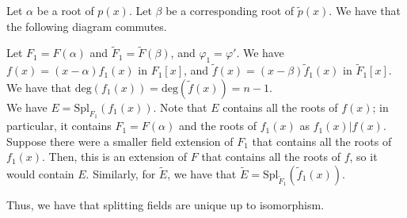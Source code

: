 \documentclass[10pt]{extarticle}
\begin{document}
  Let $\alpha$ be a root of $p(x)$. Let $\beta$ be a corresponding root of $\tilde{p}(x)$. We have that the following diagram commutes.
  \begin{center}
  \end{center}
  Let $F_1 = F(\alpha)$ and $\tilde{F}_1 = \tilde{F}(\beta)$, and $\varphi_1 = \varphi'$. We have $f(x) = (x-\alpha)f_1(x)$ in $F_1[x]$, and $\tilde{f}(x) = (x-\beta)\tilde{f}_1(x)$ in $\tilde{F}_1[x]$. We have that $\text{deg}(f_1(x)) = \text{deg}(\tilde{f}(x)) = n-1$.\\

  We have $E = \text{Spl}_{F_1}(f_1(x))$. Note that $E$ contains all the roots of $f(x)$; in particular, it contains $F_1 = F(\alpha)$ and the roots of $f_1(x)$ as $f_1(x) | f(x)$. Suppose there were a smaller field extension of $F_1$ that contains all the roots of $f_1(x)$. Then, this is an extension of $F$ that contains all the roots of $f$, so it would contain $E$. Similarly, for $\tilde{E}$, we have that $\tilde{E} = \text{Spl}_{\tilde{F}_1}(\tilde{f}_1(x))$.
  \begin{center}
  \end{center}
  Thus, we have that splitting fields are unique up to isomorphism.
\end{document}
